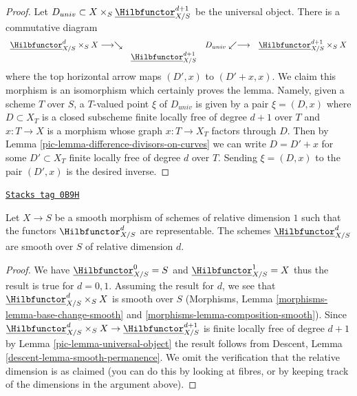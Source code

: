 \begin{proof}

Let $D_{univ} \subset X \times_S \underline{\Hilbfunctor}^{d + 1}_{X/S}$
be the universal object. There is a commutative diagram
$$
\begin{array}{cccc}\underline{\Hilbfunctor}^d_{X/S} \times_S X \longrightarrow\searrow &  & D_{univ} \swarrow\longrightarrow & \underline{\Hilbfunctor}^{d + 1}_{X/S} \times_S X \\  & \underline{\Hilbfunctor}^{d + 1}_{X/S} &  & \end{array}
$$
where the top horizontal arrow maps $(D', x)$ to $(D' + x, x)$.
We claim this morphism is an isomorphism
which certainly proves the lemma. Namely, given a scheme $T$ over $S$,
a $T$-valued point $\xi$ of $D_{univ}$ is given by a pair $\xi = (D, x)$
where $D \subset X_T$ is a closed subscheme finite locally free
of degree $d + 1$ over $T$ and $x : T \to X$ is a morphism whose
graph $x : T \to X_T$ factors through $D$. Then by
Lemma \ref{pic-lemma-difference-divisors-on-curves}
we can write $D = D' + x$ for some $D' \subset X_T$ finite locally
free of degree $d$ over $T$. Sending $\xi = (D, x)$ to the pair
$(D', x)$ is the desired inverse.
\end{proof}

\begin{lemma}
\label{pic-lemma-hilb-d-smooth}
\href{https://stacks.math.columbia.edu/tag/0B9H}{\texttt{Stacks tag 0B9H}}

Let $X \to S$ be a smooth morphism of schemes of relative dimension $1$
such that the functors $\Hilbfunctor^d_{X/S}$ are representable. The
schemes $\underline{\Hilbfunctor}^d_{X/S}$ are smooth over $S$ of
relative dimension $d$.
\end{lemma}

\begin{proof}

We have $\underline{\Hilbfunctor}^0_{X/S} = S$ and
$\underline{\Hilbfunctor}^1_{X/S} = X$ thus the result is true for $d = 0, 1$.
Assuming the result for $d$, we see that
$\underline{\Hilbfunctor}^d_{X/S} \times_S X$ is smooth over $S$
(Morphisms, Lemma \ref{morphisms-lemma-base-change-smooth} and
\ref{morphisms-lemma-composition-smooth}). Since
$\underline{\Hilbfunctor}^d_{X/S} \times_S X \to
\underline{\Hilbfunctor}^{d + 1}_{X/S}$
is finite locally free of degree $d + 1$ by
Lemma \ref{pic-lemma-universal-object}
the result follows from
Descent, Lemma \ref{descent-lemma-smooth-permanence}.
We omit the verification that the relative dimension is
as claimed (you can do this by looking at fibres, or by
keeping track of the dimensions in the argument above).
\end{proof}

